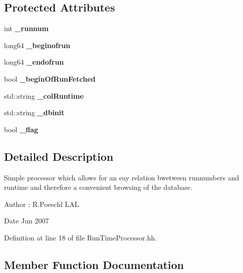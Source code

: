 \subsection*{Protected Attributes}
\begin{DoxyCompactItemize}
\item 
int {\bfseries \_\-runnum}\label{classmarlin_1_1RunTimeProcessor_a226602232ec99af268c81e0b928aa785}

\item 
long64 {\bfseries \_\-beginofrun}\label{classmarlin_1_1RunTimeProcessor_a2801c1b8c0d4daa85e436ea969549629}

\item 
long64 {\bfseries \_\-endofrun}\label{classmarlin_1_1RunTimeProcessor_a1769a8281ce2531d7e486bd852dc5fd6}

\item 
bool {\bfseries \_\-beginOfRunFetched}\label{classmarlin_1_1RunTimeProcessor_a064ab19d742cc513c1c3415e7fbba7b5}

\item 
std::string {\bfseries \_\-colRuntime}\label{classmarlin_1_1RunTimeProcessor_a6526b4be2886ba43df9208122a1ebf96}

\item 
std::string {\bfseries \_\-dbinit}\label{classmarlin_1_1RunTimeProcessor_ae1fe5999ff7a51f6eb2bfb21670fd4d5}

\item 
bool {\bfseries \_\-flag}\label{classmarlin_1_1RunTimeProcessor_afba9e89de5bf364a966fe0b920c346ad}

\end{DoxyCompactItemize}


\subsection{Detailed Description}
Simple processor which allows for an eay relation bwetween runnumbers and runtime and therefore a convenient browsing of the database. \begin{DoxyAuthor}{Author}
: R.Poeschl LAL
\end{DoxyAuthor}
\begin{DoxyDate}{Date}
Jun 2007 
\end{DoxyDate}


Definition at line 18 of file RunTimeProcessor.hh.

\subsection{Member Function Documentation}
